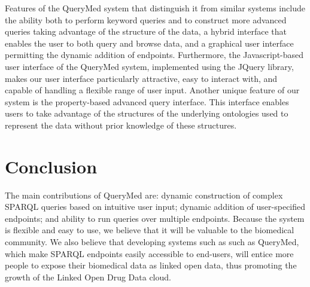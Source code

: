 \documentclass{acm_proc_article-sp}
\begin{document}
Features of the QueryMed system that distinguish it from similar systems include the ability both to perform keyword queries and to construct more advanced queries taking advantage of the structure of the data, a hybrid interface that enables the user to both query and browse data, and a graphical user interface permitting the dynamic addition of endpoints.  Furthermore, the Javascript-based user interface of the QueryMed system, implemented using the JQuery library, makes our user interface particularly attractive, easy to interact with, and capable of handling a flexible range of user input.  Another unique feature of our system is the property-based advanced query interface. This interface enables users to take advantage of the structures of the underlying ontologies used to represent the data without prior knowledge of these structures. 

\section{Conclusion}
\label{conclusion}

The main contributions of QueryMed are: dynamic construction of complex SPARQL queries based on intuitive user input; dynamic addition of user-specified endpoints; and ability to run queries over multiple endpoints. Because the system is flexible and easy to use, we believe that it will be valuable to the biomedical community.  We also believe that developing systems such as such as QueryMed, which make SPARQL endpoints  easily accessible to end-users, will entice more people to expose their biomedical data as linked open data, thus promoting the growth of the Linked Open Drug Data cloud.



\end{document}
